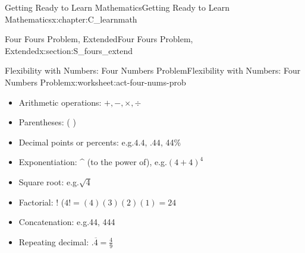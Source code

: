 \documentclass[oneside,10pt,]{book}
\newcommand{\tabularfont}{\relax}
\newlength{\fillinmaxwidth}
\newlength{\fillincontract}
\newlength{\fillinheight}
\newcommand{\fillintext}[1]{%
\setlength{\fillinmaxwidth}{#1em*\real{0.5}}%
\setlength{\fillincontract}{#1em*\real{0.5}*\real{0.2}}%
\setlength{\fillinheight}{\heightof{\strut}+1.2pt}%
\strut\nobreak\leaders\vbox{\hrule width 0.3pt height 0.3pt \vskip -1.2pt}\hskip 1\fillinmaxwidth minus \fillincontract\nobreak\strut%
}
\numberwithin{equation}{chapter}
\newcommand{\hrulethin}  {\noalign{\hrule height 0.04em}}
\newcommand{\hrulemedium}{\noalign{\hrule height 0.07em}}
\begin{document}
\begin{chapterptx}{Getting Ready to Learn Mathematics}{}{Getting Ready to Learn Mathematics}{}{}{x:chapter:C_learnmath}
\begin{sectionptx}{Four Fours Problem, Extended}{}{Four Fours Problem, Extended}{}{}{x:section:S_fours_extend}
\begin{worksheet-subsection}{Flexibility with Numbers: Four Numbers Problem}{}{Flexibility with Numbers: Four Numbers Problem}{}{}{x:worksheet:act-four-nums-prob}
\begin{introduction}{}
\begin{itemize}[label=\textbullet]
\item{}Arithmetic operations: \(+, -, \times, \div\)%
\item{}Parentheses: ( )%
\item{}Decimal points or percents: e.g.\@ \(4.4\), \(.44\), 44\%%
\item{}Exponentiation: \textasciicircum{} (to the power of), e.g.\@ \((4 + 4)^4\)%
\item{}Square root: e.g.\@ \(\sqrt{4}\)%
\item{}Factorial: ! (\(4! = (4)(3)(2)(1) = 24\)%
\item{}Concatenation: e.g.\@ 44, 444%
\item{}Repeating decimal: \(. \overline{4} = \frac{4}{9}\)%
\end{itemize}
%
\end{introduction}%
\end{worksheet-subsection}
\end{sectionptx}
\end{chapterptx}
\end{document}
